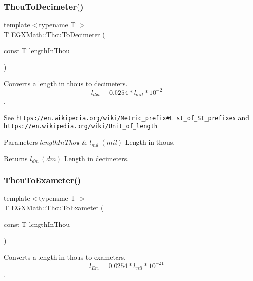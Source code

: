 \subsubsection{\texorpdfstring{Thou\+To\+Decimeter()}{ThouToDecimeter()}}
{\footnotesize\ttfamily template$<$typename T $>$ \\
T E\+G\+X\+Math\+::\+Thou\+To\+Decimeter (\begin{DoxyParamCaption}\item[{const T}]{length\+In\+Thou }\end{DoxyParamCaption})}



Converts a length in thous to decimeters. \[ l_{dm}=0.0254 * l_{mil} * 10^{-2} \]. 

See \href{https://en.wikipedia.org/wiki/Metric_prefix#List_of_SI_prefixes}{\tt https\+://en.\+wikipedia.\+org/wiki/\+Metric\+\_\+prefix\#\+List\+\_\+of\+\_\+\+S\+I\+\_\+prefixes} and \href{https://en.wikipedia.org/wiki/Unit_of_length}{\tt https\+://en.\+wikipedia.\+org/wiki/\+Unit\+\_\+of\+\_\+length} 
\begin{DoxyParams}{Parameters}
{\em length\+In\+Thou} & $ l_{mil}\ (mil)$ Length in thous. \\
\hline
\end{DoxyParams}
\begin{DoxyReturn}{Returns}
$ l_{dm}\ (dm)$ Length in decimeters. 
\end{DoxyReturn}
\mbox{\label{group___e_g_x_math-_conversions-_length_conversions-_imperial-_thou-_s_i_ga727138bc2a5fb18f959a675df44b6306}} 
\subsubsection{\texorpdfstring{Thou\+To\+Exameter()}{ThouToExameter()}}
{\footnotesize\ttfamily template$<$typename T $>$ \\
T E\+G\+X\+Math\+::\+Thou\+To\+Exameter (\begin{DoxyParamCaption}\item[{const T}]{length\+In\+Thou }\end{DoxyParamCaption})}



Converts a length in thous to exameters. \[ l_{Em}=0.0254 * l_{mil} * 10^{-21} \]. 

